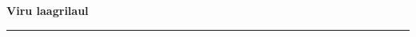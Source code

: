\documentclass[10pt]{book}
\begin{document}
{
  \samepage
  \raggedbottom
  \raggedright
  \sloppy


  \vspace{0.2in}

  \noindent\begin{minipage}{.1\textwidth}
    \hfill\vspace{0.1in}
  \end{minipage}%
  \noindent\begin{minipage}{.8\textwidth}
    \centering
    \bfseries
    \large Viru laagrilaul 
  \end{minipage}%
  \noindent\begin{minipage}{.1\textwidth}
      \hfill\vspace{0.1in}
  \end{minipage}

  \nopagebreak[4]
  \vspace{0.1in}
  \nopagebreak[4]
  \hrule height 0.05ex
  \nopagebreak[4]
  \vspace{-0.05in}




}
\end{document}
